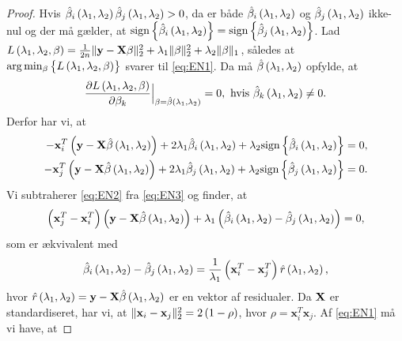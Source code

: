 \begin{proof}
Hvis \(\hat{\beta}_i \del{\lambda_1, \lambda_2} \hat{\beta}_j \del{\lambda_1, \lambda_2} > 0\), da er både \(\hat{\beta}_i \del{\lambda_1, \lambda_2}\) og \(\hat{\beta}_j \del{\lambda_1, \lambda_2}\) ikke-nul og der må gælder, at \(\text{sign} \cbr{\hat{\beta}_i \del{\lambda_1, \lambda_2}} = \text{sign} \cbr{\hat{\beta}_j \del{\lambda_1, \lambda_2}}\).
Lad \(L \del{\lambda_1,\lambda_2, \beta} = \frac{1}{2n} \Vert \y - \X \beta \Vert_2^2 + \lambda_1 \Vert \beta \Vert_2^2 + \lambda_2 \Vert \beta \Vert_1\), således at  \(\arg \min_{\beta} \cbr{L \del{\lambda_1,\lambda_2, \beta}}\) svarer til \eqref{eq:EN1}.
Da må \(\hat{\beta} \del{\lambda_1, \lambda_2}\) opfylde, at
\begin{align*}
\frac{\partial L \del{\lambda_1,\lambda_2, \beta} }{\partial \beta_k} \Bigr|_{\beta = \hat{\beta} \del{\lambda_1, \lambda_2}}=0, \text{ hvis } \hat{\beta}_k \del{\lambda_1, \lambda_2} \neq 0.
\end{align*}
Derfor har vi, at
\begin{align}
-\mathbf{x}_i^T \del{\y - \X \hat{\beta} \del{\lambda_1, \lambda_2}} + 2 \lambda_1 \hat{\beta}_i \del{\lambda_1, \lambda_2} + \lambda_2 \text{sign} \cbr{\hat{\beta}_i \del{\lambda_1, \lambda_2}} &= 0, \label{eq:EN2}\\
-\mathbf{x}_j^T \del{\y - \X \hat{\beta} \del{\lambda_1, \lambda_2}} + 2 \lambda_1 \hat{\beta}_j \del{\lambda_1, \lambda_2} + \lambda_2 \text{sign} \cbr{\hat{\beta}_j \del{\lambda_1, \lambda_2}} &= 0. \label{eq:EN3}
\end{align}
Vi subtraherer \eqref{eq:EN2} fra \eqref{eq:EN3} og finder, at
\begin{align*}
\del{\mathbf{x}_j^T-\mathbf{x}_i^T} \del{\y - \X \hat{\beta} \del{\lambda_1, \lambda_2}} + \lambda_1 \del{\hat{\beta}_i \del{\lambda_1, \lambda_2} - \hat{\beta}_j \del{\lambda_1, \lambda_2}} =0,
\end{align*}
som er ækvivalent med
\begin{align}
\hat{\beta}_i \del{\lambda_1, \lambda_2} - \hat{\beta}_j \del{\lambda_1, \lambda_2} = \frac{1}{\lambda_1} \del{\mathbf{x}_i^T-\mathbf{x}_j^T} \hat{r}\del{\lambda_1, \lambda_2}, \label{eq:EN4}
\end{align}
hvor \(\hat{r}\del{\lambda_1, \lambda_2} = \y - \X  \hat{\beta} \del{\lambda_1, \lambda_2}\) er en vektor af residualer.
Da \(\mathbf{X}\) er standardiseret, har vi, at \(\Vert \mathbf{x}_i - \mathbf{x}_j \Vert_2^2=2 \del{1-\rho}\), hvor \(\rho = \mathbf{x}_i^T \mathbf{x}_j\).
Af \eqref{eq:EN1} må vi have, at

\end{proof}
